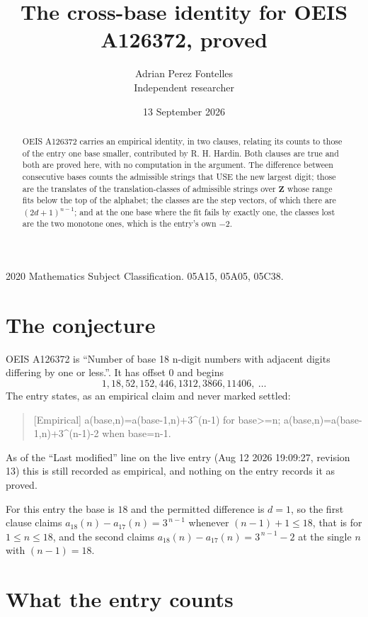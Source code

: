 \documentclass[11pt,a4paper]{article}
\title{The cross-base identity for OEIS A126372, proved}
\author{Adrian Perez Fontelles\\ \small Independent researcher}
\date{13 September 2026}
\theoremstyle{plain}
\theoremstyle{definition}
\begin{document}
\maketitle

\begin{abstract}
OEIS A126372 carries an empirical identity, in two clauses, relating its counts to those of the
entry one base smaller, contributed by R. H. Hardin. Both clauses are true and both are proved
here, with no computation in the argument. The difference between consecutive bases counts the
admissible strings that USE the new largest digit; those are the translates of the
translation-classes of admissible strings over $\mathbf{Z}$ whose range fits below the top of
the alphabet; the classes are the step vectors, of which there are $(2d+1)^{n-1}$; and at the
one base where the fit fails by exactly one, the classes lost are the two monotone ones, which
is the entry's own $-2$.
\end{abstract}

\noindent\small 2020 Mathematics Subject Classification. 05A15, 05A05, 05C38.\normalsize

\section{The conjecture}

OEIS A126372 is ``Number of base 18 n-digit numbers with adjacent digits differing by one or less.''. It has offset $0$ and begins
\[
1, 18, 52, 152, 446, 1312, 3866, 11406,\ \dots
\]
The entry states, as an empirical claim and never marked settled:
\begin{quote}
[Empirical] a(base,n)=a(base-1,n)+3\textasciicircum{}(n-1) for base>=n; a(base,n)=a(base-1,n)+3\textasciicircum{}(n-1)-2 when base=n-1.
\end{quote}
As of the ``Last modified'' line on the live entry (Aug 12 2026 19:09:27, revision 13)
this is still recorded as empirical, and nothing on the entry records it as proved.

For this entry the base is $18$ and the permitted difference is $d=1$, so the first clause
claims $a_{18}(n)-a_{17}(n)=3^{\,n-1}$ whenever $(n-1)+1\le18$, that is for
$1\le n\le18$, and the second claims $a_{18}(n)-a_{17}(n)=3^{\,n-1}-2$ at the single
$n$ with $(n-1)=18$.

\section{What the entry counts}
\end{document}
